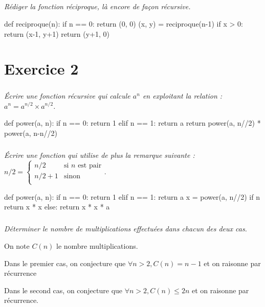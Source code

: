 \documentclass[10pt,fleqn]{book} %
\begin{document}
\begin{multicols}{2}
\subparagraph{}\textit{Rédiger la fonction réciproque, là encore de façon récursive.}
\ifprof
\begin{corrige}
\begin{python}
def reciproque(n):
    if n == 0:
        return (0, 0)
    (x, y) = reciproque(n-1)
    if x > 0:
        return (x-1, y+1)
    return (y+1, 0)
\end{python}
\end{corrige}
\else
\fi



\section*{Exercice 2}
\setcounter{subparagraph}{0}
\subparagraph{}
\textit{Écrire une fonction récursive qui calcule $a^n$ en exploitant la relation : $a^n=a^{n/2}\times a^{n/2}$.}
\ifprof
\begin{corrige}
\begin{python}
def power(a, n):
    if n == 0:
        return 1
    elif n == 1:
        return a
    return power(a, n//2) * power(a, n-n//2)
\end{python}
\end{corrige}
\else
\fi

\subparagraph{}
\textit{Écrire une fonction qui utilise de plus la remarque suivante :}
$n/2 = \left\{ 
\begin{array}{ll} 
n/2 & \text{si }n \text{ est pair} \\
n/2+1 & \text{sinon}\\
\end{array}
\right.
$.
\ifprof
\begin{corrige}
\begin{python}
def power(a, n):
    if n == 0:
        return 1
    elif n == 1:
        return a
    x = power(a, n//2)
    if n %
        return x * x
    else:
        return x * x * a
\end{python}
\end{corrige}
\else
\fi


\subparagraph{}
\textit{Déterminer le nombre de multiplications effectuées dans chacun des deux cas.}
\ifprof
\begin{corrige}
On note $C(n)$ le nombre multiplications.

Dans le premier cas, on conjecture que $\forall n>2, C(n)=n-1$ et on raisonne par récurrence

Dans le second cas, on conjecture que $\forall n>2, C(n)\leq 2n$ et on raisonne par récurrence.
\end{corrige}
\else
\fi




\end{multicols}
\end{document}
